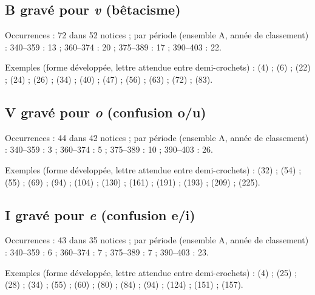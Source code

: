 \subsection*{B gravé pour \textit{v} (bêtacisme)}
\noindent Occurrences : 72 dans 52 notices ; par période (ensemble A, année de classement) : 340–359 : 13 ; 360–374 : 20 ; 375–389 : 17 ; 390–403 : 22.\par
\noindent Exemples (forme développée, lettre attendue entre demi-crochets) :  (4) ;  (6) ;  (22) ;  (24) ;  (26) ;  (34) ;  (40) ;  (47) ;  (56) ;  (63) ;  (72) ;  (83).\par
{}\par\medskip
\subsection*{V gravé pour \textit{o} (confusion o/u)}
\noindent Occurrences : 44 dans 42 notices ; par période (ensemble A, année de classement) : 340–359 : 3 ; 360–374 : 5 ; 375–389 : 10 ; 390–403 : 26.\par
\noindent Exemples (forme développée, lettre attendue entre demi-crochets) :  (32) ;  (54) ;  (55) ;  (69) ;  (94) ;  (104) ;  (130) ;  (161) ;  (191) ;  (193) ;  (209) ;  (225).\par
{}\par\medskip
\subsection*{I gravé pour \textit{e} (confusion e/i)}
\noindent Occurrences : 43 dans 35 notices ; par période (ensemble A, année de classement) : 340–359 : 6 ; 360–374 : 7 ; 375–389 : 7 ; 390–403 : 23.\par
\noindent Exemples (forme développée, lettre attendue entre demi-crochets) :  (4) ;  (25) ;  (28) ;  (34) ;  (55) ;  (60) ;  (80) ;  (84) ;  (94) ;  (124) ;  (151) ;  (157).\par
{}\par\medskip

